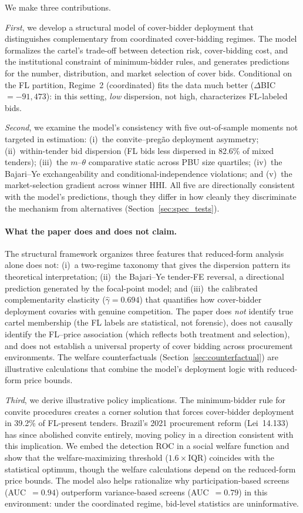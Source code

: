 We make three contributions.

\emph{First}, we develop a structural model of cover-bidder
deployment that distinguishes complementary from coordinated
cover-bidding regimes. The model formalizes the cartel's trade-off
between detection risk, cover-bidding cost, and the institutional
constraint of minimum-bidder rules, and generates predictions for the
number, distribution, and market selection of cover bids.
Conditional on the FL partition, Regime~2 (coordinated) fits the
data much better ($\Delta$BIC~$= -91{,}473$): in this setting,
\emph{low} dispersion, not high, characterizes FL-labeled bids.

\emph{Second}, we examine the model's consistency with five
out-of-sample moments not targeted in estimation:
(i)~the convite--preg\~ao deployment asymmetry;
(ii)~within-tender bid dispersion (FL bids less dispersed in
82.6\% of mixed tenders); (iii)~the $m$--$\theta$ comparative
static across PBU size quartiles; (iv)~the Bajari--Ye
exchangeability and conditional-independence violations; and
(v)~the market-selection gradient across winner HHI. All five are directionally consistent with the model's predictions,
though they differ in how cleanly they discriminate the mechanism
from alternatives (Section~\ref{sec:spec_tests}).

\paragraph{What the paper does and does not claim.}
The structural framework organizes three features that reduced-form
analysis alone does not: (i)~a two-regime taxonomy that gives the
dispersion pattern its theoretical interpretation; (ii)~the
Bajari--Ye tender-FE reversal, a directional prediction generated by
the focal-point model; and (iii)~the calibrated complementarity
elasticity ($\hat{\gamma} = 0.694$) that quantifies how cover-bidder
deployment covaries with genuine competition. The paper does
\emph{not} identify true cartel membership (the FL labels are
statistical, not forensic), does not causally identify the
FL--price association (which reflects both treatment and selection),
and does not establish a universal property of cover bidding across
procurement environments. The welfare counterfactuals
(Section~\ref{sec:counterfactual}) are illustrative calculations that
combine the model's deployment logic with reduced-form price bounds.

\emph{Third}, we derive illustrative policy implications. The
minimum-bidder rule for convite procedures creates a corner solution
that forces cover-bidder deployment in 39.2\% of FL-present
tenders. Brazil's 2021 procurement reform (Lei~14.133) has since
abolished convite entirely, moving policy in a direction consistent
with this implication. We embed the detection ROC in a social
welfare function and show that the welfare-maximizing threshold
($1.6\times$IQR) coincides with the statistical optimum, though
the welfare calculations depend on the reduced-form price bounds.
The model also helps rationalize why participation-based screens
(AUC~$= 0.94$) outperform variance-based screens
(AUC~$= 0.79$) in this environment: under the coordinated regime,
bid-level statistics are uninformative.

